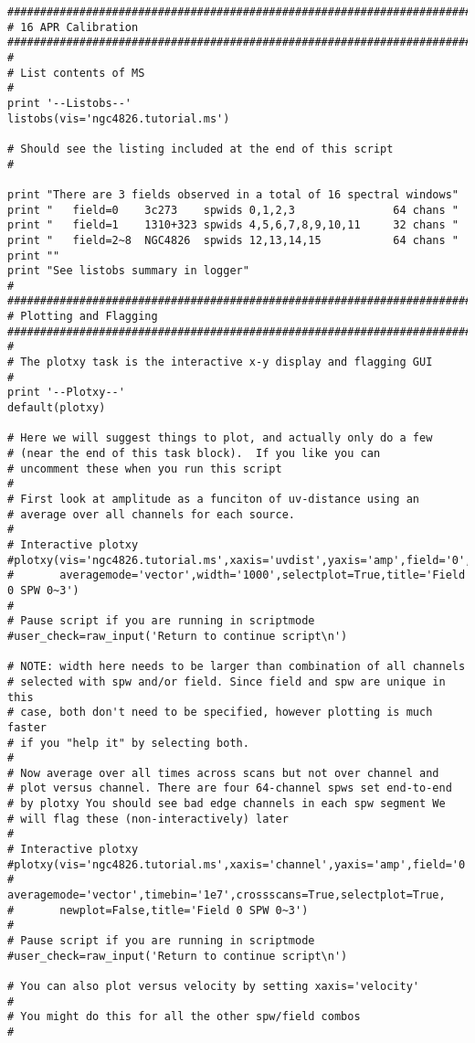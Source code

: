 \begin{verbatim}
##########################################################################
# 16 APR Calibration
##########################################################################
#
# List contents of MS
#
print '--Listobs--'
listobs(vis='ngc4826.tutorial.ms')

# Should see the listing included at the end of this script
#

print "There are 3 fields observed in a total of 16 spectral windows"
print "   field=0    3c273    spwids 0,1,2,3               64 chans "
print "   field=1    1310+323 spwids 4,5,6,7,8,9,10,11     32 chans "
print "   field=2~8  NGC4826  spwids 12,13,14,15           64 chans "
print ""
print "See listobs summary in logger"
#
##########################################################################
# Plotting and Flagging
##########################################################################
#
# The plotxy task is the interactive x-y display and flagging GUI
#
print '--Plotxy--'
default(plotxy)

# Here we will suggest things to plot, and actually only do a few
# (near the end of this task block).  If you like you can
# uncomment these when you run this script
#
# First look at amplitude as a funciton of uv-distance using an
# average over all channels for each source.
#
# Interactive plotxy
#plotxy(vis='ngc4826.tutorial.ms',xaxis='uvdist',yaxis='amp',field='0',spw='0~3',
#       averagemode='vector',width='1000',selectplot=True,title='Field 0 SPW 0~3')
#	
# Pause script if you are running in scriptmode
#user_check=raw_input('Return to continue script\n')

# NOTE: width here needs to be larger than combination of all channels
# selected with spw and/or field. Since field and spw are unique in this
# case, both don't need to be specified, however plotting is much faster
# if you "help it" by selecting both.
#
# Now average over all times across scans but not over channel and
# plot versus channel. There are four 64-channel spws set end-to-end
# by plotxy You should see bad edge channels in each spw segment We
# will flag these (non-interactively) later
#
# Interactive plotxy
#plotxy(vis='ngc4826.tutorial.ms',xaxis='channel',yaxis='amp',field='0',spw='0~3',
#       averagemode='vector',timebin='1e7',crossscans=True,selectplot=True,
#       newplot=False,title='Field 0 SPW 0~3')
#
# Pause script if you are running in scriptmode
#user_check=raw_input('Return to continue script\n')

# You can also plot versus velocity by setting xaxis='velocity'
#
# You might do this for all the other spw/field combos
#


\end{verbatim}
